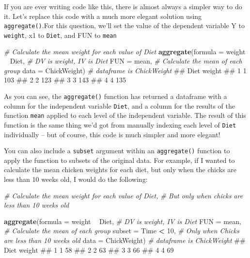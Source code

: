 \documentclass[]{book}
\newenvironment{Shaded}{\begin{snugshade}}{\end{snugshade}}
\newcommand{\KeywordTok}[1]{\textcolor[rgb]{0.13,0.29,0.53}{\textbf{#1}}}
\newcommand{\DataTypeTok}[1]{\textcolor[rgb]{0.13,0.29,0.53}{#1}}
\newcommand{\DecValTok}[1]{\textcolor[rgb]{0.00,0.00,0.81}{#1}}
\newcommand{\StringTok}[1]{\textcolor[rgb]{0.31,0.60,0.02}{#1}}
\newcommand{\CommentTok}[1]{\textcolor[rgb]{0.56,0.35,0.01}{\textit{#1}}}
\newcommand{\OperatorTok}[1]{\textcolor[rgb]{0.81,0.36,0.00}{\textbf{#1}}}
\newcommand{\NormalTok}[1]{#1}
\theoremstyle{definition}
\theoremstyle{definition}
\theoremstyle{remark}
\begin{document}
If you are ever writing code like this, there is almost always a simpler
way to do it. Let's replace this code with a much more elegant solution
using \texttt{aggregate()}.For this question, we'll set the value of the
dependent variable Y to \texttt{weight}, x1 to \texttt{Diet}, and FUN to
\texttt{mean}

\begin{Shaded}
\begin{Highlighting}[]
\CommentTok{# Calculate the mean weight for each value of Diet}
\KeywordTok{aggregate}\NormalTok{(}\DataTypeTok{formula =}\NormalTok{ weight }\OperatorTok{~}\StringTok{ }\NormalTok{Diet,  }\CommentTok{# DV is weight, IV is Diet}
          \DataTypeTok{FUN =}\NormalTok{ mean,               }\CommentTok{# Calculate the mean of each group}
          \DataTypeTok{data =}\NormalTok{ ChickWeight)       }\CommentTok{# dataframe is ChickWeight}
\NormalTok{##   Diet weight}
\NormalTok{## 1    1    103}
\NormalTok{## 2    2    123}
\NormalTok{## 3    3    143}
\NormalTok{## 4    4    135}
\end{Highlighting}
\end{Shaded}

As you can see, the \texttt{aggregate()} function has returned a
dataframe with a column for the independent variable \texttt{Diet}, and
a column for the results of the function \texttt{mean} applied to each
level of the independent variable. The result of this function is the
same thing we'd got from manually indexing each level of \texttt{Diet}
individually -- but of course, this code is much simpler and more
elegant!

You can also include a \texttt{subset} argument within an
\texttt{aggregate()} function to apply the function to subsets of the
original data. For example, if I wanted to calculate the mean chicken
weights for each diet, but only when the chicks are less than 10 weeks
old, I would do the following:

\begin{Shaded}
\begin{Highlighting}[]
\CommentTok{# Calculate the mean weight for each value of Diet,}
\CommentTok{#  But only when chicks are less than 10 weeks old}

\KeywordTok{aggregate}\NormalTok{(}\DataTypeTok{formula =}\NormalTok{ weight }\OperatorTok{~}\StringTok{ }\NormalTok{Diet,  }\CommentTok{# DV is weight, IV is Diet}
          \DataTypeTok{FUN =}\NormalTok{ mean,               }\CommentTok{# Calculate the mean of each group}
          \DataTypeTok{subset =}\NormalTok{ Time }\OperatorTok{<}\StringTok{ }\DecValTok{10}\NormalTok{,       }\CommentTok{# Only when Chicks are less than 10 weeks old}
          \DataTypeTok{data =}\NormalTok{ ChickWeight)       }\CommentTok{# dataframe is ChickWeight}
\NormalTok{##   Diet weight}
\NormalTok{## 1    1     58}
\NormalTok{## 2    2     63}
\NormalTok{## 3    3     66}
\NormalTok{## 4    4     69}
\end{Highlighting}
\end{Shaded}
\end{document}
